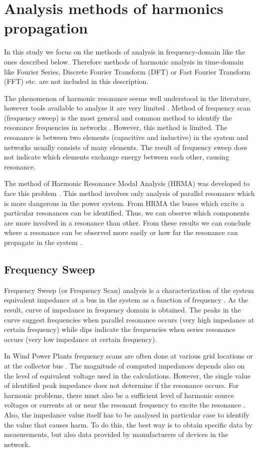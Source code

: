 \documentclass[12pt]{report} %
\begin{document}
\section{Analysis methods of harmonics propagation} \label{sec:methodsofanalysis}
In this study we focus on the methods of analysis in frequency-domain like the ones described below. Therefore methods of harmonic analysis in time-domain like Fourier Series, Discrete Fourier Transform (DFT) or Fast Fourier Transform (FFT) etc. are not included in this description.

The phenomenon of harmonic resonance seems well understood in the literature, however tools available to analyse it are very limited \cite{xu2005}. Method of frequency scan (frequency sweep) is the most general and common method to identify the resonance frequencies in networks \cite{modal1982}. However, this method is limited. The resonance is between two elements (capacitive and inductive) in the system and networks usually consists of many elements. The result of frequency sweep does not indicate which elements exchange energy between each other, causing resonance.

The method of Harmonic Resonance Modal Analysis (HRMA) was developed to face this problem \cite{xu2005}. This method involves only analysis of parallel resonance which is more dangerous in the power system. From HRMA the buses which excite a particular resonances can be identified. Thus, we can observe which components are more involved in a resonance than other. From these results we can conclude where a resonance can be observed more easily or how far the resonance can propagate in the system \cite{xu2005}.

\subsection{Frequency Sweep} \label{sec:theoryfs}
Frequency Sweep (or Frequency Scan) analysis is a characterization of the system equivalent impedance at a bus in the system as a function of frequency \cite{bradt2012}. As the result, curve of impedance in frequency domain is obtained. The peaks in the curve suggest frequencies when parallel resonance occurs (very high impedance at certain frequency) while dips indicate the frequencies when series resonance occurs (very low impedance at certain frequency). 

In Wind Power Plants frequency scans are often done at various grid locations or at the collector bus \cite{bradt2012}. The magnitude of computed impedances depends also on the level of equivalent voltage used in the calculations. However, the single value of identified peak impedance does not determine if the resonance occurs. For harmonic problems, there must also be a sufficient level of harmonic source voltages or currents at or near the resonant frequency to excite the resonance \cite{bradt2012}. Also, the impedance value itself has to be analysed in particular case to identify the value that causes harm. To do this, the best way is to obtain specific data by measurements, but also data provided by manufacturers of devices in the network.
\end{document}
